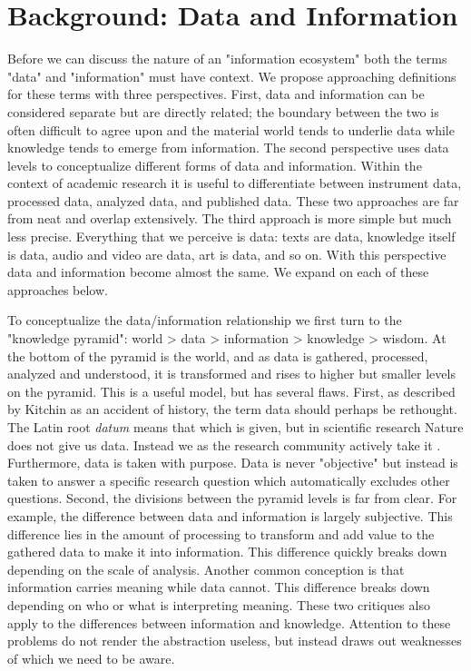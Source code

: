\section{Background: Data and Information}

Before we can discuss the nature of an "information ecosystem" both the terms "data" and "information" must have context. We propose approaching definitions for these terms with three perspectives. First, data and information can be considered separate but are directly related; the boundary between the two is often difficult to agree upon and the material world tends to underlie data while knowledge tends to emerge from information. The second perspective uses data levels to conceptualize different forms of data and information. Within the context of academic research it is useful to differentiate between instrument data, processed data, analyzed data, and published data. These two approaches are far from neat and overlap extensively. The third approach is more simple but much less precise. Everything that we perceive is data: texts are data, knowledge itself is data, audio and video are data, art is data, and so on. With this perspective data and information become almost the same. We expand on each of these approaches below.

To conceptualize the data/information relationship we first turn to the "knowledge pyramid": world > data > information > knowledge > wisdom. At the bottom of the pyramid is the world, and as data is gathered, processed, analyzed and understood, it is transformed and rises to higher but smaller levels on the pyramid. This is a useful model, but has several flaws. First, as described by Kitchin as an accident of history, the term data should perhaps be rethought. The Latin root \textit{datum} means that which is given, but in scientific research Nature does not give us data. Instead we as the research community actively take it \citep{kitchin_2014}. Furthermore, data is taken with purpose. Data is never "objective" but instead is taken to answer a specific research question which automatically excludes other questions. Second, the divisions between the pyramid levels is far from clear. For example, the difference between data and information is largely subjective. This difference lies in the amount of processing to transform and add value to the gathered data to make it into information. This difference quickly breaks down depending on the scale of analysis. Another common conception is that information carries meaning while data cannot. This difference breaks down depending on who or what is interpreting meaning. These two critiques also apply to the differences between information and knowledge. Attention to these problems do not render the abstraction useless, but instead draws out weaknesses of which we need to be aware.

